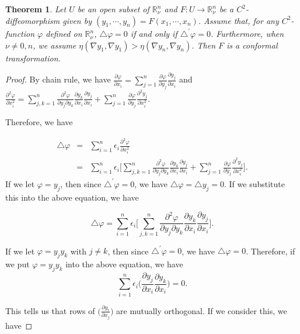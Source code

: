 \documentclass[a4paper,10pt]{amsart}
\theoremstyle{plain}
\newtheorem{thm}{Theorem}[section]
\newtheorem*{main theorem}{Theorem}
\theoremstyle{definition}
\begin{document}
\begin{thm} \label{main1}
Let $U$ be an open subset of $\mathbb{R}^n_\nu$ and $F : U
\rightarrow \mathbb{R}^n_\nu$ be a $C^2$-diffeomorphism given by
$(y_1, \cdots, y_n) = F(x_1, \cdots, x_n)$. Assume that, for any
$C^2$-function $\varphi$ defined on $\mathbb{R}^n_\nu$, $\triangle
\varphi =0$ if and only if $\triangle^\prime \varphi = 0$.
Furthermore, when $\nu \neq 0, n$, we assume $\eta(\nabla y_1,
\nabla y_1)
> \eta(\nabla y_n, \nabla y_n)$. Then $F$ is a conformal
transformation.
\end{thm}
\begin{proof}
By chain rule, we have $\frac{\partial \varphi}{\partial x_i} =
\sum\limits_{j=1}^n \frac{\partial \varphi}{\partial y_j}
\frac{\partial y_j}{\partial x_i}$ and $\frac{\partial^2
\varphi}{\partial x_i^2} = \sum\limits_{j,k=1}^{n}
\frac{\partial^2 \varphi}{\partial y_j\partial y_k} \frac{\partial
y_k}{\partial x_i} \frac{\partial y_j}{\partial x_i} +
\sum\limits_{j=1}^n \frac{\partial \varphi}{\partial y_j}
\frac{\partial^2 y_j}{\partial x_i^2}$.

Therefore, we have

\begin{eqnarray*}
\triangle \varphi & = &\sum\limits_{i=1}^n \epsilon_i
\frac{\partial^2 \varphi}{\partial x_i^2} \\
& = & \sum\limits_{i=1}^n \epsilon_i \Big[ \sum\limits_{j,k=1}^{n}
\frac{\partial^2 \varphi}{\partial y_j\partial y_k} \frac{\partial
y_k}{\partial x_i} \frac{\partial y_j}{\partial x_i} +
\sum\limits_{j=1}^n \frac{\partial \varphi}{\partial y_j}
\frac{\partial^2 y_j}{\partial x_i^2} \Big].
\end{eqnarray*}
If we let $\varphi = y_j$, then since $\triangle^\prime \varphi =
0$, we have $\triangle \varphi = \triangle y_j = 0$. If we
substitute this into the above equation, we have

$$ \triangle \varphi = \sum\limits_{i=1}^n \epsilon_i \Big[ \sum\limits_{j,k=1}^{n}
\frac{\partial^2 \varphi}{\partial y_j\partial y_k} \frac{\partial
y_k}{\partial x_i} \frac{\partial y_j}{\partial x_i} \Big].$$

If we let $\varphi = y_j y_k$ with $j \neq k$, then since
$\triangle^\prime \varphi = 0$, we have $\triangle \varphi = 0$.
Therefore, if we put $\varphi = y_j y_k$ into the above equation,
we have
$$ \sum\limits_{i=1}^n \epsilon_i \Big( \frac{\partial
y_j}{\partial x_i} \frac{\partial y_k}{\partial x_i} \Big) = 0.$$

This tells us that rows of $\Big( \frac{\partial y_i}{\partial
x_j} \Big)$ are mutually orthogonal. If we consider this, we have


\end{proof}
\end{document}
